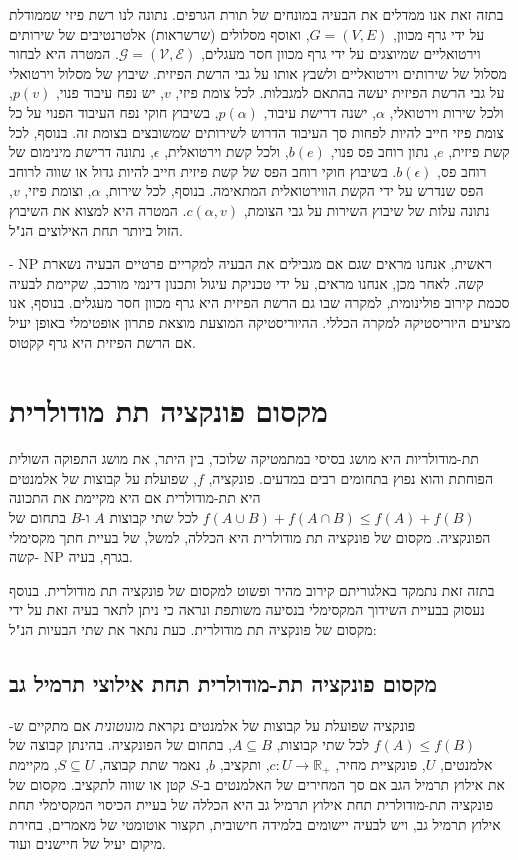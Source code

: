 \begin{hebrew}
בתזה זאת אנו ממדלים את הבעיה במונחים של תורת הגרפים.
נתונה לנו רשת פיזי שממודלת על ידי גרף מכוון,
$G=(V,E)$,
ואוסף מסלולים (שרשראות) אלטרנטיבים של שירותים וירטואליים שמיוצגים על ידי גרף מכוון חסר מעגלים,
$\mathcal{G} = (\mathcal{V}, \mathcal{E})$.
המטרה היא לבחור מסלול של שירותים וירטואליים ולשבץ אותו על גבי הרשת הפיזית.
שיבוץ של מסלול וירטואלי על גבי הרשת הפיזית יעשה בהתאם למגבלות.
לכל צומת פיזי,
$v$,
 יש נפח עיבוד פנוי,
$p(v)$,
ולכל שירות וירטואלי,
$\alpha$,
ישנה דרישת עיבוד,
$p(\alpha)$,
בשיבוץ חוקי נפח העיבוד הפנוי על כל צומת פיזי חייב להיות לפחות סך העיבוד הדרוש לשירותים שמשובצים בצומת זה.
בנוסף, לכל קשת פיזית,
$e$,
נתון רוחב פס פנוי,
$b(e)$,
ולכל קשת וירטואלית,
$\epsilon$,
נתונה דרישת מינימום של רוחב פס,
$b(\epsilon)$.
בשיבוץ חוקי רוחב הפס של קשת פיזית חייב להיות גדול או שווה לרוחב הפס שנדרש על ידי הקשת הווירטואלית  המתאימה.
בנוסף, לכל שירות,
$\alpha$,
וצומת פיזי,
$v$,
נתונה עלות של שיבוץ השירות על גבי הצומת,
$c(\alpha, v)$.
המטרה היא למצוא את השיבוץ הזול ביותר תחת האילוצים הנ"ל.

ראשית, אנחנו מראים שגם אם מגבילים את הבעיה למקריים פרטיים הבעיה נשארת
$\text{NP}$%
-קשה.
לאחר מכן, אנחנו מראים, על ידי טכניקת עיגול ותכנון דינמי מורכב, שקיימת לבעיה סכמת קירוב פולינומית, למקרה שבו גם הרשת הפיזית היא גרף מכוון חסר מעגלים.
בנוסף, אנו מציעים היוריסטיקה למקרה הכללי.
ההיוריסטיקה המוצעת  מוצאת פתרון אופטימלי באופן יעיל אם הרשת הפיזית היא גרף קקטוס.


\section*{\texthebrew{מקסום פונקציה תת מודולרית}}
תת-מודולריות היא מושג בסיסי במתמטיקה שלוכד, בין היתר, את מושג התפוקה השולית הפוחתת והוא נפוץ בתחומים רבים במדעים.
פונקציה,
$f$,
שפועלת על קבוצות של אלמנטים היא תת-מודולרית אם היא מקיימת את התכונה
$f(A \cup B) + f(A \cap B) \leq f(A) + f(B)$
לכל שתי קבוצות $A$ ו-$B$ בתחום של הפונקציה.
מקסום של פונקציה תת מודולרית היא הכללה, למשל, של בעיית חתך מקסימלי בגרף, בעיה
$\text{NP}$
-קשה.

בתזה זאת נתמקד באלגוריתם קירוב מהיר ופשוט למקסום של פונקציה תת מודולרית.
בנוסף נעסוק בבעיית השידוך המקסימלי בנסיעה משותפת ונראה כי ניתן לתאר בעיה זאת על ידי מקסום של פונקציה תת מודולרית.
כעת נתאר את שתי הבעיות הנ"ל:

\subsection*{\texthebrew{מקסום פונקציה תת-מודולרית תחת אילוצי תרמיל גב}}
פונקציה שפועלת על קבוצות  של אלמנטים נקראת
\emph{מונוטונית}
אם מתקיים ש-%
$f(A) \leq f(B)$
לכל שתי קבוצות,
$A \subseteq B$,
בתחום של הפונקציה.
בהינתן קבוצה של אלמנטים, $U$, פונקציית מחיר,
$c:U \to \mathbb{R_+}$,
ותקציב, $b$, נאמר שתת קבוצה,
$S \subseteq U$,
מקיימת את אילוץ תרמיל הגב אם סך המחירים של האלמנטים ב-$S$ קטן או שווה לתקציב.
מקסום של פונקציה תת-מודולרית תחת אילוץ תרמיל גב היא הכללה של בעיית הכיסוי המקסימלי תחת אילוץ תרמיל גב,
ויש לבעיה יישומים בלמידה חישובית, תקצור אוטומטי של מאמרים, בחירת מיקום יעיל של חיישנים ועוד.



\end{hebrew}
